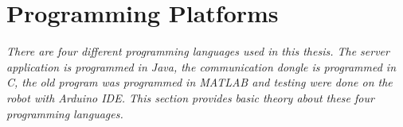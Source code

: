 \section{Programming Platforms}
\label{sec:tProgrammingPlatform}
\textit{There are four different programming languages used in this thesis. The server application is programmed in Java, the communication dongle is programmed in C, the old program was programmed in MATLAB and testing were done on the robot with Arduino IDE. This section provides basic theory about these four programming languages.}



